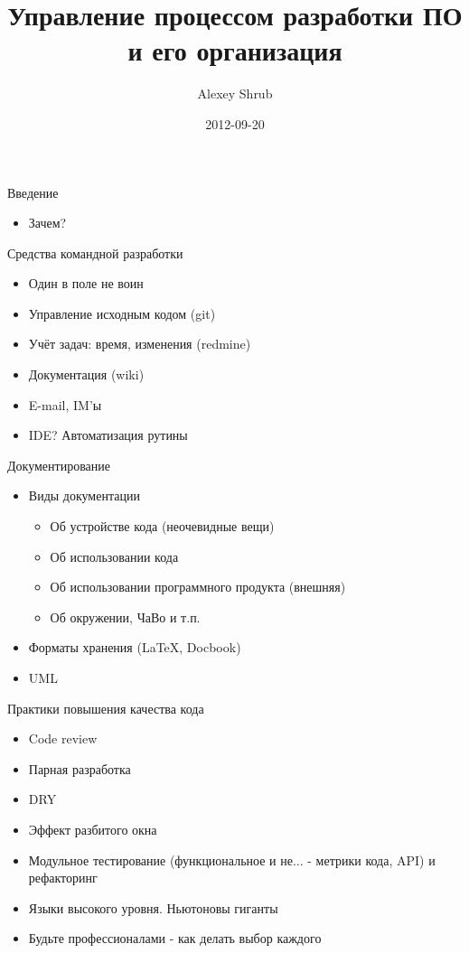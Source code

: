 \documentclass[aspectratio=169]{beamer}
\title{Управление процессом разработки ПО и его организация}
\author{Alexey Shrub}
\date{2012-09-20}
\begin{document}
\maketitle

\begin{frame}{Введение}
\begin{itemize}
\item Зачем?
\end{itemize}
\end{frame}

\begin{frame}{Средства командной разработки}
\begin{itemize}
\item Один в поле не воин
\pause
\item Управление исходным кодом (git)
\pause
\item Учёт задач: время, изменения (redmine)
\pause
\item Документация (wiki)
\pause
\item E-mail, IM'ы
\pause
\item IDE? Автоматизация рутины
\end{itemize}
\end{frame}

\begin{frame}{Документирование}
\begin{itemize}
\item Виды документации
\begin{itemize}
\item Об устройстве кода (неочевидные вещи)
\pause
\item Об использовании кода
\pause
\item Об использовании программного продукта (внешняя)
\pause
\item Об окружении, ЧаВо и т.п.
\end{itemize}
\pause
\item Форматы хранения (LaTeX, Docbook)
\pause
\item UML
\end{itemize}
\end{frame}

\begin{frame}{Практики повышения качества кода}
\begin{itemize}
\item Code review
\pause
\item Парная разработка
\pause
\item DRY
\pause
\item Эффект разбитого окна
\pause
\item Модульное тестирование (функциональное и не... - метрики кода, API) и рефакторинг
\pause
\item Языки высокого уровня. Ньютоновы гиганты
\pause
\item Будьте профессионалами - как делать выбор каждого
\end{itemize}
\end{frame}
\end{document}
